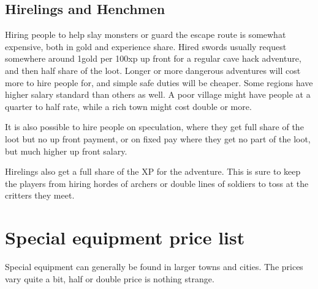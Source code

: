 \subsection*{Hirelings and Henchmen}
Hiring people to help slay monsters or guard the escape route is somewhat expensive, both in gold and experience share. Hired swords usually request somewhere around 1gold per 100xp up front for a regular cave hack adventure, and then half share of the loot. Longer or more dangerous adventures will cost more to hire people for, and simple safe duties will be cheaper. Some regions have higher salary standard than others as well. A poor village might have people at a quarter to half rate, while a rich town might cost double or more.

It is also possible to hire people on speculation, where they get full share of the loot but no up front payment, or on fixed pay where they get no part of the loot, but much higher up front salary.

Hirelings also get a full share of the XP for the adventure. This is sure to keep the players from hiring hordes of archers or double lines of soldiers to toss at the critters they meet.










\pagebreak[1]
\section*{Special equipment price list}

Special equipment can generally be found in larger towns and cities.
The prices vary quite a bit, half or double price is nothing strange.

